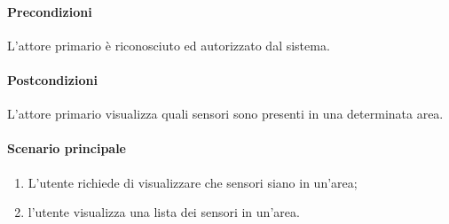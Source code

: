 \paragraph{Precondizioni}L'attore primario è riconosciuto ed autorizzato dal sistema.
\paragraph{Postcondizioni} L'attore primario visualizza quali sensori sono presenti in una determinata area.

\paragraph{Scenario principale}
\begin{enumerate}
    \item L'utente richiede di visualizzare che sensori siano in un'area;
    \item l'utente visualizza una lista dei sensori in un'area.
\end{enumerate}